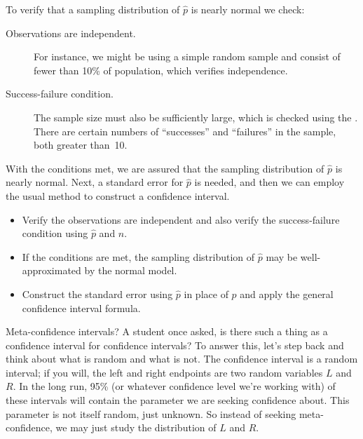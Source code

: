 To verify that a sampling distribution of $\hat{p}$ is nearly normal we check:
\begin{description}
\item[Observations are independent.] For instance, we might be using a simple random sample and consist of fewer than 10\% of population, which verifies independence.
\item[Success-failure condition.] The sample size must also be sufficiently large, which is checked using the . There are certain numbers of ``successes'' and ``failures'' in the sample, both greater than~10.
\end{description}
With the conditions met, we are assured that the sampling distribution of $\hat{p}$ is nearly normal. Next, a standard error for $\hat{p}$ is needed, and then we can employ the usual method to construct a confidence interval.

\begin{termBox}{\vspace{-1mm}
\begin{itemize}
\setlength{\itemsep}{0mm}
\item Verify the observations are independent and also verify the success-failure condition using $\hat{p}$ and $n$.
\item If the conditions are met, the sampling distribution of $\hat{p}$ may be well-approximated by the normal model.
\item Construct the standard error using $\hat{p}$ in place of $p$ and apply the general confidence interval formula.\vspace{1mm}
\end{itemize}}
\end{termBox}


\begin{example}{Meta-confidence intervals?}
A student once asked, is there such a thing as a confidence interval for confidence intervals?
To answer this, let's step back and think about what is random and what is not. The confidence interval is a random interval; if you will, the left and right endpoints are two random variables $L$ and $R$.
In the long run, 95\% (or whatever confidence level we're working with) of these intervals will contain the parameter we are seeking confidence about. This parameter is not itself random, just unknown.
So instead of seeking meta-confidence, we may just study the distribution of $L$ and $R$.
\end{example}

